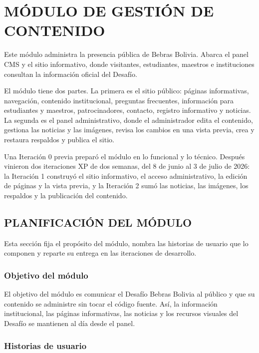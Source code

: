 \chapter{MÓDULO DE GESTIÓN DE CONTENIDO}

Este módulo administra la presencia pública de Bebras Bolivia. Abarca el panel CMS y el sitio informativo, donde visitantes, estudiantes, maestros e instituciones consultan la información oficial del Desafío.

El módulo tiene dos partes. La primera es el sitio público: páginas informativas, navegación, contenido institucional, preguntas frecuentes, información para estudiantes y maestros, patrocinadores, contacto, registro informativo y noticias. La segunda es el panel administrativo, donde el administrador edita el contenido, gestiona las noticias y las imágenes, revisa los cambios en una vista previa, crea y restaura respaldos y publica el sitio.

Una Iteración 0 previa preparó el módulo en lo funcional y lo técnico. Después vinieron dos iteraciones XP de dos semanas, del 8 de junio al 3 de julio de 2026: la Iteración 1 construyó el sitio informativo, el acceso administrativo, la edición de páginas y la vista previa, y la Iteración 2 sumó las noticias, las imágenes, los respaldos y la publicación del contenido.

\section{PLANIFICACIÓN DEL MÓDULO}

Esta sección fija el propósito del módulo, nombra las historias de usuario que lo componen y reparte su entrega en las iteraciones de desarrollo.

\subsection{Objetivo del módulo}

El objetivo del módulo es comunicar el Desafío Bebras Bolivia al público y que su contenido se administre sin tocar el código fuente. Así, la información institucional, las páginas informativas, las noticias y los recursos visuales del Desafío se mantienen al día desde el panel.

\subsection{Historias de usuario}

